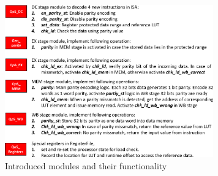 \begin{figure}
\centering
\includegraphics[width=90mm]{./eps/qos_arch_explain_date16}
\caption{Introduced modules and their functionality}
\vspace{-3mm}
\label{fig:qos_arch_explain}
\end{figure}



